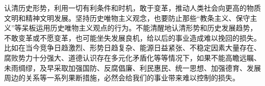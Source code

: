 \documentclass[openany,oneside]{book}
\theoremstyle{cthmstyle}
\theoremstyle{definition}
\theoremstyle{remark}
\begin{document}
认清历史形势，利用一切有利条件和时机，敢于变革，推动人类社会向更高的物质文明和精神文明发展。坚持历史唯物主义观念，也要防止那些“教条主义、保守主义”等呆板运用历史唯物主义观点的行为。不能清醒地认清形势和历史发展趋势，不敢变革或不愿变革，也可能坐失发展良机，给以后的事业造成难以挽回的损失。比如在当今竞争日趋激烈、形势日趋复杂、能源日益紧张、不稳定因素大量存在、腐败势力十分强大、道德认识存在多元化矛盾化等等情况下，如果不能高瞻远瞩、未雨绸缪，及早采取加强国防、反腐倡廉、利民惠民、统一思想、加强德育、发展周边的关系等一系列果断措施，必然会给我们的事业带来难以控制的损失。

%
{}
\rule{0pt}{0pt}\par
\nocite{*} %

\end{document}
